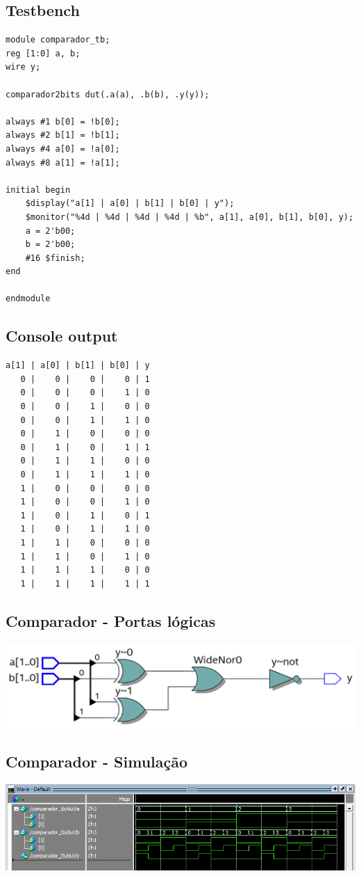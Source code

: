 \documentclass{article}
\begin{document}
\subsection{Testbench}
\begin{verbatim}
module comparador_tb;
reg [1:0] a, b;
wire y;

comparador2bits dut(.a(a), .b(b), .y(y));

always #1 b[0] = !b[0];
always #2 b[1] = !b[1];
always #4 a[0] = !a[0];
always #8 a[1] = !a[1];

initial begin
    $display("a[1] | a[0] | b[1] | b[0] | y");
    $monitor("%4d | %4d | %4d | %4d | %b", a[1], a[0], b[1], b[0], y);
    a = 2'b00;
    b = 2'b00;
    #16 $finish;
end

endmodule
\end{verbatim}

\newpage

\subsection{Console output}
\begin{verbatim}
a[1] | a[0] | b[1] | b[0] | y
   0 |    0 |    0 |    0 | 1
   0 |    0 |    0 |    1 | 0
   0 |    0 |    1 |    0 | 0
   0 |    0 |    1 |    1 | 0
   0 |    1 |    0 |    0 | 0
   0 |    1 |    0 |    1 | 1
   0 |    1 |    1 |    0 | 0
   0 |    1 |    1 |    1 | 0
   1 |    0 |    0 |    0 | 0
   1 |    0 |    0 |    1 | 0
   1 |    0 |    1 |    0 | 1
   1 |    0 |    1 |    1 | 0
   1 |    1 |    0 |    0 | 0
   1 |    1 |    0 |    1 | 0
   1 |    1 |    1 |    0 | 0
   1 |    1 |    1 |    1 | 1
\end{verbatim}

\subsection{Comparador - Portas lógicas}
\includegraphics[width=1.0\textwidth]{comparador_rtl.png}

\subsection{Comparador - Simulação}
\includegraphics[width=1.0\textwidth]{comparador_wave.png}
\end{document}
